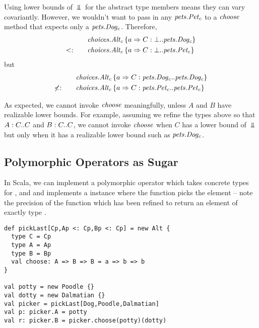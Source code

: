 \documentclass[9pt]{sigplanconf}
\begin{document}
Using lower bounds of $\Bot$ for the abstract type members means they
can vary covariantly. However, we wouldn't want to pass in any
${\mathit{pets.Pet_c}}$ to a $\mathit{choose}$ method that expects only a
${\mathit{pets.Dog_c}}$. Therefore,
\begin{align*}
&{\mathit{choices.Alt_c} \left\{a \Rightarrow C : \bot..\mathit{pets.Dog_c} \right\}}\\
<:\quad\quad&{\mathit{choices.Alt_c} \left\{a \Rightarrow C : \bot..\mathit{pets.Pet_c} \right\}}
\end{align*}
but
\begin{align*}
&{\mathit{choices.Alt_c} \left\{a \Rightarrow C : \mathit{pets.Dog_c}..\mathit{pets.Dog_c} \right\}}\\
\not<:\quad\quad&{\mathit{choices.Alt_c} \left\{a \Rightarrow C : \mathit{pets.Pet_c}..\mathit{pets.Pet_c} \right\}}
\end{align*}

As expected, we cannot invoke $\mathit{choose}$ meaningfully, unless $A$
and $B$ have realizable lower bounds. For example, assuming we refine
the types above so that $A : C..C$ and $B : C..C$, we cannot
invoke $\mathit{choose}$ when $C$ has a lower bound of $\Bot$ but only
when it has a realizable lower bound such as $\mathit{pets.Dog_c}$.

\subsection{Polymorphic Operators as Sugar}
In Scala, we can implement a polymorphic operator 
which takes concrete types for ,  and  and
implements a  instance where the 
function picks the  element -- note the precision of the
 function which has been refined to return an element of
exactly type .
\begin{lstlisting}
def pickLast[Cp,Ap <: Cp,Bp <: Cp] = new Alt {
  type C = Cp
  type A = Ap
  type B = Bp
  val choose: A => B => B = a => b => b
}

val potty = new Poodle {}
val dotty = new Dalmatian {}
val picker = pickLast[Dog,Poodle,Dalmatian]
val p: picker.A = potty
val r: picker.B = picker.choose(potty)(dotty)
\end{lstlisting}
\end{document}
